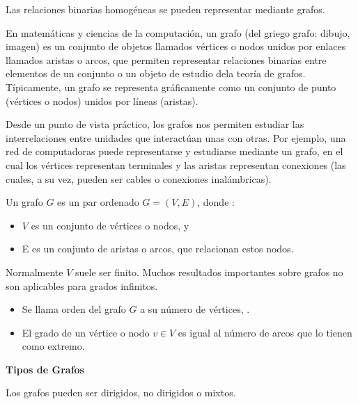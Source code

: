 Las relaciones binarias homogéneas se pueden representar mediante grafos.

En matemáticas y ciencias de la computación, un grafo (del griego grafo: dibujo, imagen) es un conjunto de objetos llamados vértices o nodos unidos por enlaces llamados aristas o arcos, que permiten representar relaciones binarias entre elementos de un conjunto o un objeto de estudio dela teoría de grafos. Típicamente, un grafo se representa gráficamente como un conjunto de punto (vértices o nodos) unidos por líneas (aristas).


Desde un punto de vista práctico, los grafos nos permiten estudiar las interrelaciones entre unidades que interactúan unas con otras. Por ejemplo, una red de computadoras puede representarse y estudiarse mediante un grafo, en el cual los vértices representan terminales y las aristas representan conexiones (las cuales, a su vez, pueden ser cables o conexiones inalámbricas).

Un grafo $G$ es un par ordenado $G = (V,E)$, donde :

\begin{itemize}
\item $V$ es un conjunto de vértices o nodos, y
\item E es un conjunto de aristas o arcos, que relacionan estos nodos.
\end{itemize}


Normalmente $V$ suele ser finito. Muchos resultados importantes sobre grafos no son aplicables para grados infinitos.

\begin{itemize}
\item Se llama orden del grafo $G$ a su número de vértices, .
\item El grado de un vértice o nodo $v \in V$ es igual al número de arcos que lo tienen como extremo.
\end{itemize}

\noindent\textbf{Tipos de Grafos}

Los grafos pueden ser dirigidos, no dirigidos o mixtos.

